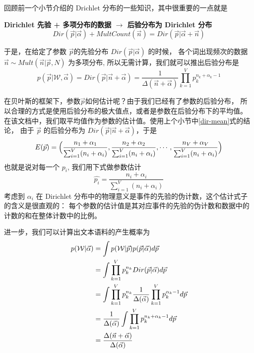 回顾前一个小节介绍的 Drichlet 分布的一些知识，其中很重要的一点就是
\begin{center}
\bf{Dirichlet 先验 + 多项分布的数据
$\longrightarrow$ 后验分布为 Dirichlet 分布}
$$ Dir(\vec{p}|\vec{\alpha}) + MultCount(\vec{n})
 = Dir(\vec{p}|\vec{\alpha}+\vec{n}) $$
\end{center}
于是，在给定了参数 $\vec{p}$的先验分布 $Dir(\vec{p}|\vec{\alpha})$ 的时候，
各个词出现频次的数据 $\vec{n} \sim Mult(\vec{n}|\vec{p},N)$ 为多项分布,
所以无需计算，我们就可以推出后验分布是
\begin{equation}
p(\vec{p}|\mathcal{W},\vec{\alpha})
= Dir(\vec{p}|\vec{n}+ \vec{\alpha})
= \frac{1}{\Delta(\vec{n}+\vec{\alpha})}
\prod_{k=1}^V p_k^{n_k + \alpha_k -1}
\end{equation}

在贝叶斯的框架下，参数$\vec{p}$如何估计呢？由于我们已经有了参数的后验分布，
所以合理的方式是使用后验分布的极大值点，或者是参数在后验分布下的平均值。
在该文档中，我们取平均值作为参数的估计值。使用上个小节中\eqref{dir-mean}式的结论，
由于 $\vec{p}$ 的后验分布为 $Dir(\vec{p}|\vec{n} + \vec{\alpha})$，于是
$$
 E(\vec{p}) = \Bigl(\frac{n_1 + \alpha_1}{\sum_{i=1}^V(n_i + \alpha_i)},
 \frac{n_2 + \alpha_2}{\sum_{i=1}^V(n_i + \alpha_i)}, \cdots,
 \frac{n_V + \alpha_V}{\sum_{i=1}^V(n_i + \alpha_i)} \Bigr)
$$
也就是说对每一个 $p_i$, 我们用下式做参数估计
\begin{equation}
\label{dirichlet-parameter-estimation}
 \hat{p_i} = \frac{n_i + \alpha_i}{\sum_{i=1}^V(n_i + \alpha_i)}
\end{equation}
考虑到 $\alpha_i$ 在 Dirichlet 分布中的物理意义是事件的先验的伪计数，这个估计式子的含义是很直观的：
每个参数的估计值是其对应事件的先验的伪计数和数据中的计数的和在整体计数中的比例。

进一步，我们可以计算出文本语料的产生概率为
\begin{align}
p(\mathcal{W}|\vec{\alpha}) & = \int p(\mathcal{W}|\vec{p}) p(\vec{p}|\vec{\alpha})d\vec{p} \notag  \\
& = \int \prod_{k=1}^V p_k^{n_k} Dir(\vec{p}|\vec{\alpha}) d\vec{p} \notag  \\
& = \int \prod_{k=1}^V p_k^{n_k} \frac{1}{\Delta(\vec{\alpha})}
\prod_{k=1}^V p_k^{\alpha_k -1} d\vec{p} \notag  \\
& = \frac{1}{\Delta(\vec{\alpha})}
\int \prod_{k=1}^V p_k^{n_k + \alpha_k -1} d\vec{p} \notag \\
& = \frac{\Delta(\vec{n}+\vec{\alpha})}{\Delta(\vec{\alpha})}
\label{likelihood-dir-mult}
\end{align}

